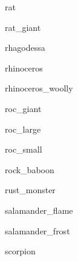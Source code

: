\documentclass[letterpaper,serif]{module}
\begin{document}
\begin{newmonster}{rat}\end{newmonster}

\begin{newmonster}{rat_giant}\end{newmonster}

\begin{newmonster}{rhagodessa}\end{newmonster}

\begin{newmonster}{rhinoceros}\end{newmonster}

\begin{newmonster}{rhinoceros_woolly}\end{newmonster}

\begin{newmonster}{roc_giant}\end{newmonster}

\begin{newmonster}{roc_large}\end{newmonster}

\begin{newmonster}{roc_small}\end{newmonster}

\begin{newmonster}{rock_baboon}\end{newmonster}

\begin{newmonster}{rust_monster}\end{newmonster}

\begin{newmonster}{salamander_flame}\end{newmonster}

\begin{newmonster}{salamander_frost}\end{newmonster}

\begin{newmonster}{scorpion}\end{newmonster}
\end{document}
